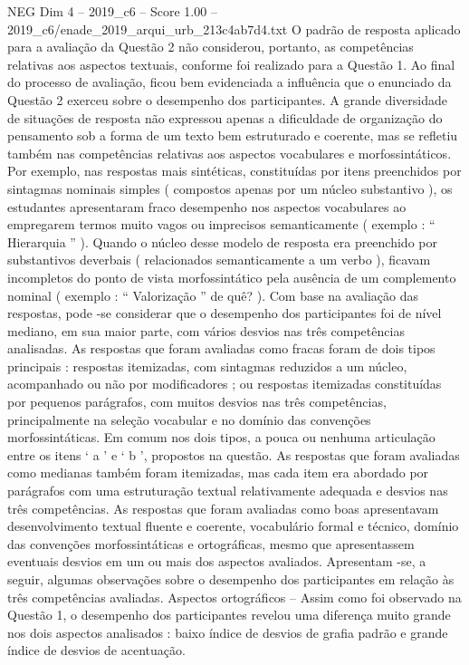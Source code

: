 \begin{textsample}{NEG Dim 4 – 2019\_c6 – Score 1.00 – 2019\_c6/enade\_2019\_arqui\_urb\_213c4ab7d4.txt}
O padrão de resposta aplicado para a avaliação da Questão 2 não considerou, portanto, as competências relativas aos aspectos textuais, conforme foi realizado para a Questão 1.
Ao final do processo de avaliação, ficou bem evidenciada a influência que o enunciado da Questão 2 exerceu sobre o desempenho dos participantes.
A grande diversidade de situações de resposta não expressou apenas a dificuldade de organização do pensamento sob a forma de um texto bem estruturado e coerente, mas se refletiu também nas competências relativas aos aspectos vocabulares e morfossintáticos.
Por exemplo, nas respostas mais sintéticas, constituídas por itens preenchidos por sintagmas nominais simples ( compostos apenas por um núcleo substantivo ), os estudantes apresentaram fraco desempenho nos aspectos vocabulares ao empregarem termos muito vagos ou imprecisos semanticamente ( exemplo : “ Hierarquia ” ).
Quando o núcleo desse modelo de resposta era preenchido por substantivos deverbais ( relacionados semanticamente a um verbo ), ficavam incompletos do ponto de vista morfossintático pela ausência de um complemento nominal ( exemplo : “ Valorização ” de quê? ).
Com base na avaliação das respostas, pode -se considerar que o desempenho dos participantes foi de nível mediano, em sua maior parte, com vários desvios nas três competências analisadas.
As respostas que foram avaliadas como fracas foram de dois tipos principais : respostas itemizadas, com sintagmas reduzidos a um núcleo, acompanhado ou não por modificadores ; ou respostas itemizadas constituídas por pequenos parágrafos, com muitos desvios nas três competências, principalmente na seleção vocabular e no domínio das convenções morfossintáticas.
Em comum nos dois tipos, a pouca ou nenhuma articulação entre os itens ‘ a ’ e ‘ b ’, propostos na questão.
As respostas que foram avaliadas como medianas também foram itemizadas, mas cada item era abordado por parágrafos com uma estruturação textual relativamente adequada e desvios nas três competências.
As respostas que foram avaliadas como boas apresentavam desenvolvimento textual fluente e coerente, vocabulário formal e técnico, domínio das convenções morfossintáticas e ortográficas, mesmo que apresentassem eventuais desvios em um ou mais dos aspectos avaliados.
Apresentam -se, a seguir, algumas observações sobre o desempenho dos participantes em relação às três competências avaliadas.
Aspectos ortográficos – Assim como foi observado na Questão 1, o desempenho dos participantes revelou uma diferença muito grande nos dois aspectos analisados : baixo índice de desvios de grafia padrão e grande índice de desvios de acentuação.

\end{textsample}
